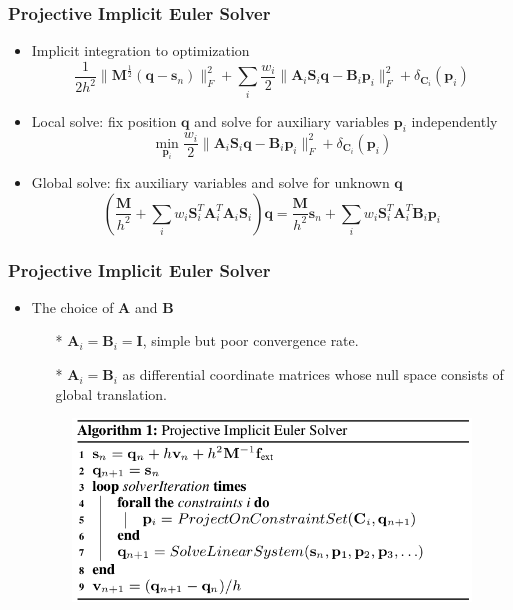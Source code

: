 \documentclass[serif,mathserif]{beamer}
\begin{document}
\begin{frame}
 \frametitle{Projective Implicit Euler Solver}
 \begin{itemize}
  \item Implicit integration to optimization
    \begin{equation*}
      \frac{1}{2h^2}\|\mathbf{M}^{\frac{1}{2}}(\mathbf{q}-\mathbf{s}_n)\|^2_F+\sum_i \frac{w_i}{2}\|\mathbf{A}_i
      \mathbf{S}_i\mathbf{q}-\mathbf{B}_i\mathbf{p}_i\|^2_F+\delta_{\mathbf{C}_i}(\mathbf{p}_i)
    \end{equation*}
  \item Local solve: fix position $\mathbf{q}$ and solve for auxiliary variables $\mathbf{p}_i$ independently
    \begin{equation*}
     \min_{\mathbf{p}_i} \frac{w_i}{2}\|\mathbf{A}_i
      \mathbf{S}_i\mathbf{q}-\mathbf{B}_i\mathbf{p}_i\|^2_F+\delta_{\mathbf{C}_i}(\mathbf{p}_i)
    \end{equation*}
  \item Global solve: fix auxiliary variables and solve for unknown $\mathbf{q}$
    \begin{equation*}
     (\frac{\mathbf{M}}{h^2}+\sum_i w_i\mathbf{S}_i^T\mathbf{A}_i^T\mathbf{A}_i\mathbf{S}_i)\mathbf{q}=\frac{\mathbf{M}}{h^2}
     \mathbf{s}_n + \sum_i w_i\mathbf{S}_i^T\mathbf{A}_i^T\mathbf{B}_i\mathbf{p}_i
    \end{equation*}
 \end{itemize}
\end{frame}

\begin{frame}
 \frametitle{Projective Implicit Euler Solver}
 \begin{itemize}
  \item The choice of $\mathbf{A}$ and $\mathbf{B}$
    \begin{itemize}
     \item[*] $\mathbf{A}_i=\mathbf{B}_i=\mathbf{I}$, simple but poor convergence rate.
     \item[*] $\mathbf{A}_i=\mathbf{B}_i$ as differential coordinate matrices whose null space consists of global translation.
    \end{itemize}
  \begin{figure}[h]
    \centering
    \includegraphics[scale=0.4]{pic/algorithm.png}
  \end{figure}
 \end{itemize}
\end{frame}
\end{document}
